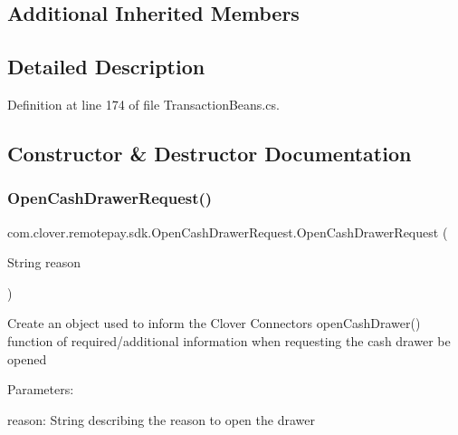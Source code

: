\subsection*{Additional Inherited Members}


\subsection{Detailed Description}


Definition at line 174 of file Transaction\+Beans.\+cs.



\subsection{Constructor \& Destructor Documentation}
\mbox{\label{classcom_1_1clover_1_1remotepay_1_1sdk_1_1_open_cash_drawer_request_a9d8de60bf3fdf3f0ab0349e4da2e1efa}} 
\subsubsection{\texorpdfstring{Open\+Cash\+Drawer\+Request()}{OpenCashDrawerRequest()}}
{\footnotesize\ttfamily com.\+clover.\+remotepay.\+sdk.\+Open\+Cash\+Drawer\+Request.\+Open\+Cash\+Drawer\+Request (\begin{DoxyParamCaption}\item[{String}]{reason }\end{DoxyParamCaption})}

Create an object used to inform the Clover Connector\textquotesingle{}s {\ttfamily open\+Cash\+Drawer()} function of required/additional information when requesting the cash drawer be opened


\begin{DoxyItemize}
\item Parameters\+:
\begin{DoxyItemize}
\item reason\+: String describing the reason to open the drawer 
\end{DoxyItemize}
\end{DoxyItemize}


